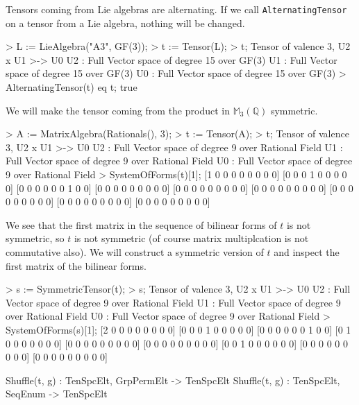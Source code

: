 \begin{example}[AlternatingTensor]

Tensors coming from Lie algebras are alternating.
If we call \texttt{AlternatingTensor} on a tensor from a Lie algebra, nothing will be changed.
\begin{code}
> L := LieAlgebra("A3", GF(3));
> t := Tensor(L);
> t;
Tensor of valence 3, U2 x U1 >-> U0
U2 : Full Vector space of degree 15 over GF(3)
U1 : Full Vector space of degree 15 over GF(3)
U0 : Full Vector space of degree 15 over GF(3)
> AlternatingTensor(t) eq t;
true
\end{code}
\end{example}

\begin{example}[MakeSymmetric]

We will make the tensor coming from the product in $\mathbb{M}_3(\mathbb{Q})$ symmetric.
\begin{code}
> A := MatrixAlgebra(Rationals(), 3);
> t := Tensor(A);
> t;
Tensor of valence 3, U2 x U1 >-> U0
U2 : Full Vector space of degree 9 over Rational Field
U1 : Full Vector space of degree 9 over Rational Field
U0 : Full Vector space of degree 9 over Rational Field
> SystemOfForms(t)[1];
[1 0 0 0 0 0 0 0 0]
[0 0 0 1 0 0 0 0 0]
[0 0 0 0 0 0 1 0 0]
[0 0 0 0 0 0 0 0 0]
[0 0 0 0 0 0 0 0 0]
[0 0 0 0 0 0 0 0 0]
[0 0 0 0 0 0 0 0 0]
[0 0 0 0 0 0 0 0 0]
[0 0 0 0 0 0 0 0 0]
\end{code}

We see that the first matrix in the sequence of bilinear forms of $t$ is not symmetric, so $t$ is not symmetric (of course matrix multiplcation is not commutative also). 
We will construct a symmetric version of $t$ and inspect the first matrix of the bilinear forms.
\begin{code}
> s := SymmetricTensor(t);
> s;
Tensor of valence 3, U2 x U1 >-> U0
U2 : Full Vector space of degree 9 over Rational Field
U1 : Full Vector space of degree 9 over Rational Field
U0 : Full Vector space of degree 9 over Rational Field
> SystemOfForms(s)[1];
[2 0 0 0 0 0 0 0 0]
[0 0 0 1 0 0 0 0 0]
[0 0 0 0 0 0 1 0 0]
[0 1 0 0 0 0 0 0 0]
[0 0 0 0 0 0 0 0 0]
[0 0 0 0 0 0 0 0 0]
[0 0 1 0 0 0 0 0 0]
[0 0 0 0 0 0 0 0 0]
[0 0 0 0 0 0 0 0 0]
\end{code}
\end{example}


\begin{intrinsics}
Shuffle(t, g) : TenSpcElt, GrpPermElt -> TenSpcElt
Shuffle(t, g) : TenSpcElt, SeqEnum -> TenSpcElt
\end{intrinsics}

